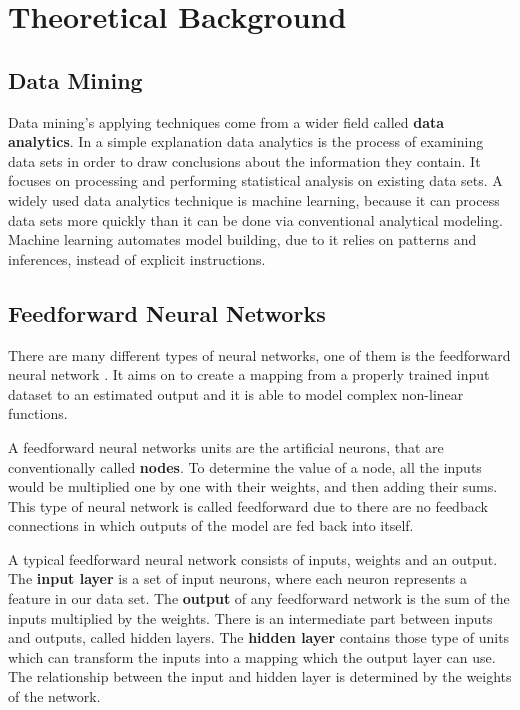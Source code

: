 \chapter{Theoretical Background}

\section{Data Mining}

Data mining's applying techniques come from a wider field called \textbf{data analytics}. In a simple explanation data analytics is the process of examining data sets in order to draw conclusions about the information they contain. It focuses on processing and performing statistical analysis on existing data sets. A widely used data analytics technique is machine learning, because it can process data sets more quickly than it can be done via conventional analytical modeling. Machine learning automates model building, due to it relies on patterns and inferences, instead of explicit instructions.




\section{Feedforward Neural Networks}

There are many different types of neural networks, one of them is the feedforward neural network \cite{fine2006feedforward}. It aims on to create a mapping from a properly trained input dataset to an estimated output and it is able to model complex non-linear functions. \medskip

A feedforward neural networks units are the artificial neurons, that are conventionally called \textbf{nodes}. To determine the value of a node, all the inputs would be multiplied one by one with their weights, and then adding their sums. This type of neural network is called feedforward due to there are no feedback connections in which outputs of the model are fed back into itself. \medskip

A typical feedforward neural network consists of inputs, weights and an output. The \textbf{input layer} is a set of input neurons, where each neuron represents a feature in our data set. The \textbf{output} of any feedforward network is the sum of the inputs multiplied by the weights. There is an intermediate part between inputs and outputs, called hidden layers. The \textbf{hidden layer} contains those type of units which can transform the inputs into a mapping which the output layer can use. The relationship between the input and hidden layer is determined by the weights of the network. \medskip


